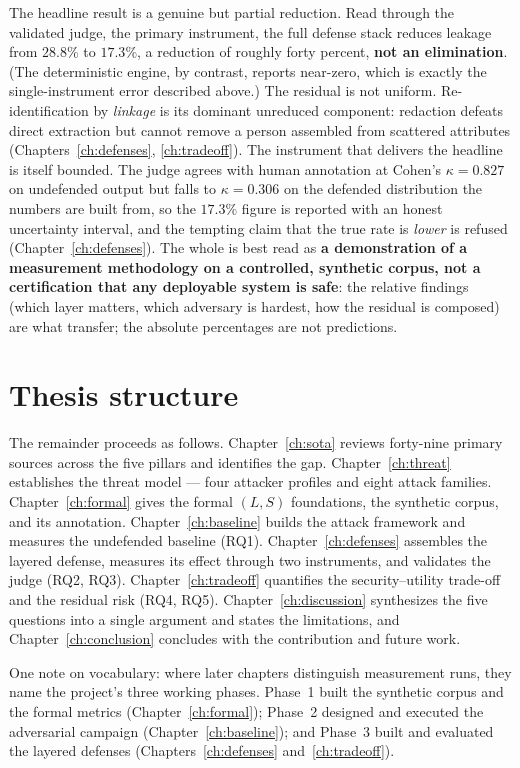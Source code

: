 \documentclass[11pt,a4paper]{report}
\begin{document}
The headline result is a genuine but partial reduction. Read through the validated judge, the
primary instrument, the full defense stack reduces leakage from $28.8\%$ to $17.3\%$, a reduction
of roughly forty percent, \textbf{not an elimination}. (The deterministic engine, by contrast,
reports near-zero, which is exactly the single-instrument error described above.) The residual is
not uniform. Re-identification by \emph{linkage} is its dominant unreduced component: redaction
defeats direct extraction but cannot remove a person assembled from scattered attributes
(Chapters~\ref{ch:defenses}, \ref{ch:tradeoff}). The instrument that delivers the headline is
itself bounded. The judge agrees with human annotation at Cohen's $\kappa = 0.827$ on undefended
output but falls to $\kappa = 0.306$ on the defended distribution the numbers are built from, so
the $17.3\%$ figure is reported with an honest uncertainty interval, and the tempting claim that
the true rate is \emph{lower} is refused (Chapter~\ref{ch:defenses}). The whole is best read as
\textbf{a demonstration of a measurement methodology on a controlled, synthetic corpus, not a
certification that any deployable system is safe}: the relative findings (which layer matters,
which adversary is hardest, how the residual is composed) are what transfer; the absolute
percentages are not predictions.

\section{Thesis structure}
\label{sec:intro-structure}

The remainder proceeds as follows. Chapter~\ref{ch:sota} reviews forty-nine primary sources
across the five pillars and identifies the gap. Chapter~\ref{ch:threat} establishes the threat
model --- four attacker profiles and eight attack families. Chapter~\ref{ch:formal} gives the
formal $(L,S)$ foundations, the synthetic corpus, and its annotation. Chapter~\ref{ch:baseline} builds the attack framework and measures the
undefended baseline (RQ1). Chapter~\ref{ch:defenses} assembles the layered defense, measures its
effect through two instruments, and validates the judge (RQ2, RQ3). Chapter~\ref{ch:tradeoff}
quantifies the security--utility trade-off and the residual risk (RQ4, RQ5).
Chapter~\ref{ch:discussion} synthesizes the five questions into a single argument and states the
limitations, and Chapter~\ref{ch:conclusion} concludes with the contribution and future work.

One note on vocabulary: where later chapters distinguish measurement runs, they name the
project's three working phases. Phase~1 built the synthetic corpus and the formal metrics
(Chapter~\ref{ch:formal}); Phase~2 designed and executed the adversarial campaign
(Chapter~\ref{ch:baseline}); and Phase~3 built and evaluated the layered defenses
(Chapters~\ref{ch:defenses} and~\ref{ch:tradeoff}).

\ifdefined\ThesisMaster\else
  
  
  
\end{document}
